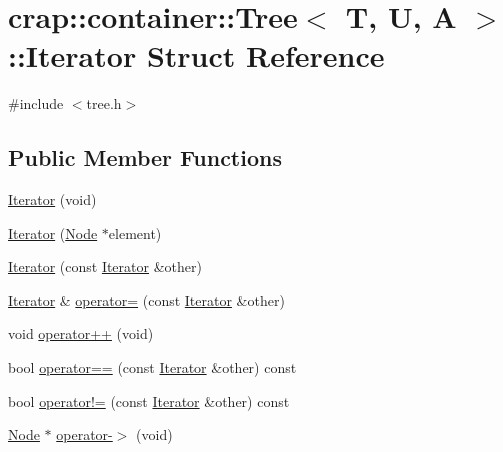 \hypertarget{structcrap_1_1container_1_1_tree_1_1_iterator}{\section{crap\-:\-:container\-:\-:Tree$<$ T, U, A $>$\-:\-:Iterator Struct Reference}
\label{structcrap_1_1container_1_1_tree_1_1_iterator}
}


{\ttfamily \#include $<$tree.\-h$>$}

\subsection*{Public Member Functions}
\begin{DoxyCompactItemize}
\item 
\hyperlink{structcrap_1_1container_1_1_tree_1_1_iterator_abeef8dc6a2bbfed9a0b901d588ff428a}{Iterator} (void)
\item 
\hyperlink{structcrap_1_1container_1_1_tree_1_1_iterator_a687097d8ad577aed2e0a1b9b5796f962}{Iterator} (\hyperlink{classcrap_1_1container_1_1_tree_a03cefa95016ea47daa5e93705ad1afe7}{Node} $\ast$element)
\item 
\hyperlink{structcrap_1_1container_1_1_tree_1_1_iterator_a3c0ff7364e635cd2aedb6d55320738ef}{Iterator} (const \hyperlink{structcrap_1_1container_1_1_tree_1_1_iterator}{Iterator} \&other)
\item 
\hyperlink{structcrap_1_1container_1_1_tree_1_1_iterator}{Iterator} \& \hyperlink{structcrap_1_1container_1_1_tree_1_1_iterator_ac6eee6b74d98cd8c707951ac45be7610}{operator=} (const \hyperlink{structcrap_1_1container_1_1_tree_1_1_iterator}{Iterator} \&other)
\item 
void \hyperlink{structcrap_1_1container_1_1_tree_1_1_iterator_a705dc9471772a877b683132b4728ccda}{operator++} (void)
\item 
bool \hyperlink{structcrap_1_1container_1_1_tree_1_1_iterator_a257edc71585612c8bd56eba7d06036de}{operator==} (const \hyperlink{structcrap_1_1container_1_1_tree_1_1_iterator}{Iterator} \&other) const 
\item 
bool \hyperlink{structcrap_1_1container_1_1_tree_1_1_iterator_a6c712699abda32742262f73431322fe8}{operator!=} (const \hyperlink{structcrap_1_1container_1_1_tree_1_1_iterator}{Iterator} \&other) const 
\item 
\hyperlink{classcrap_1_1container_1_1_tree_a03cefa95016ea47daa5e93705ad1afe7}{Node} $\ast$ \hyperlink{structcrap_1_1container_1_1_tree_1_1_iterator_ab0ddfa21f6ceebb25d1383ec63e77eb0}{operator-\/$>$} (void)

\end{DoxyCompactItemize}
